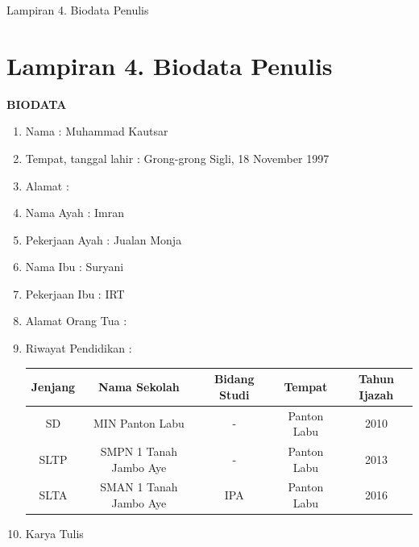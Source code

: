 \newpage
\begin{appendices}{Lampiran 4. Biodata Penulis}
    \section*{Lampiran 4. Biodata Penulis}

    \begin{center}
        \large{\textbf{BIODATA}}
    \end{center}

    \vspace*{0.5cm}

    \begin{enumerate}
        \item Nama : Muhammad Kautsar
        \item Tempat, tanggal lahir : Grong-grong Sigli, 18 November 1997
        \item Alamat : 
        \item Nama Ayah : Imran 
        \item Pekerjaan Ayah : Jualan Monja
        \item Nama Ibu : Suryani
        \item Pekerjaan Ibu : IRT
        \item Alamat Orang Tua : 
        \item Riwayat Pendidikan :
            \hspace*{1cm}
            \begin{table}[h!]
                \begin{tabular}{|c|c|c|c|c|} %
                \hline %
                Jenjang & Nama Sekolah & Bidang Studi & Tempat & Tahun Ijazah\\
                \hline %
                SD   & MIN Panton Labu & - & Panton Labu & 2010\\
                \hline
                SLTP   & SMPN 1 Tanah Jambo Aye & - & Panton Labu & 2013\\
                \hline
                SLTA   & SMAN 1 Tanah Jambo Aye & IPA & Panton Labu & 2016\\
                \hline %
                \end{tabular}
            \end{table}
        \item Karya Tulis
            \hspace*{1cm}
            \begin{table}[h!]

\end{table}
\end{enumerate}
\end{appendices}
